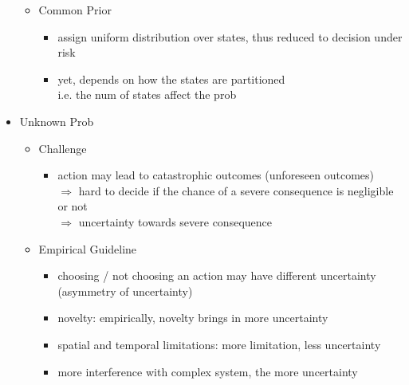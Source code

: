 \begin{itemize}
\begin{itemize}
\begin{itemize}
		\end{itemize}
	\item Common Prior
		\begin{itemize}
		\item assign uniform distribution over states, thus reduced to decision under risk
		\item yet, depends on how the states are partitioned \\ 
		i.e. the num of states affect the prob
		\end{itemize}
	\end{itemize}
\item Unknown Prob
	\begin{itemize}
	\item Challenge
		\begin{itemize}
		\item action may lead to catastrophic outcomes (unforeseen outcomes) \\
		$\Rightarrow$ hard to decide if the chance of a severe consequence is negligible or not \\
		$\Rightarrow$ uncertainty towards severe consequence
		\end{itemize}
	\item Empirical Guideline
		\begin{itemize}
		\item choosing / not choosing an action may have different uncertainty \\
		(asymmetry of uncertainty)
		\item novelty: empirically, novelty brings in more uncertainty
		\item spatial and temporal limitations: more limitation, less uncertainty
		\item more interference with complex system, the more uncertainty
		\end{itemize}
	\end{itemize}
\end{itemize}
